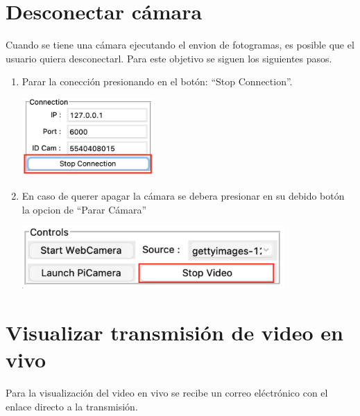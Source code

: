 \section*{Desconectar cámara}

Cuando se tiene una cámara ejecutando el envion de fotogramas, es posible que el usuario quiera desconectarl. Para este objetivo se siguen los siguientes pasos.
\begin{enumerate}
    \item Parar la conección presionando en el botón: ``Stop Connection''.
    \begin{center}
        \includegraphics[width=5cm]{img/anexos/stop_connection.png}
    \end{center}
    \item En caso de querer apagar la cámara se debera presionar en su debido botón la opcion de ``Parar Cámara''
    \begin{center}
        \includegraphics[width=10cm]{img/anexos/stop_video.png}
    \end{center}
\end{enumerate}

\section*{Visualizar transmisión de video en vivo}
Para la visualización del video en vivo se recibe un correo eléctrónico con el enlace directo a la transmisión.

